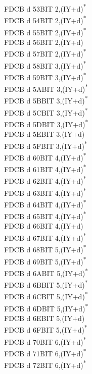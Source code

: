 \documentclass[twoside,openright,a4paper]{book}
\begin{document}
\begin{multicols}{3}
{\begin{tabbing}
	FDCB d 53\>BIT 2,(IY+d)\textsuperscript{*}\\
	FDCB d 54\>BIT 2,(IY+d)\textsuperscript{*}\\
	FDCB d 55\>BIT 2,(IY+d)\textsuperscript{*}\\
	FDCB d 56\>BIT 2,(IY+d)\\
	FDCB d 57\>BIT 2,(IY+d)\textsuperscript{*}\\
	FDCB d 58\>BIT 3,(IY+d)\textsuperscript{*}\\
	FDCB d 59\>BIT 3,(IY+d)\textsuperscript{*}\\
	FDCB d 5A\>BIT 3,(IY+d)\textsuperscript{*}\\
	FDCB d 5B\>BIT 3,(IY+d)\textsuperscript{*}\\
	FDCB d 5C\>BIT 3,(IY+d)\textsuperscript{*}\\
	FDCB d 5D\>BIT 3,(IY+d)\textsuperscript{*}\\
	FDCB d 5E\>BIT 3,(IY+d)\\
	FDCB d 5F\>BIT 3,(IY+d)\textsuperscript{*}\\
	FDCB d 60\>BIT 4,(IY+d)\textsuperscript{*}\\
	FDCB d 61\>BIT 4,(IY+d)\textsuperscript{*}\\
	FDCB d 62\>BIT 4,(IY+d)\textsuperscript{*}\\
	FDCB d 63\>BIT 4,(IY+d)\textsuperscript{*}\\
	FDCB d 64\>BIT 4,(IY+d)\textsuperscript{*}\\
	FDCB d 65\>BIT 4,(IY+d)\textsuperscript{*}\\
	FDCB d 66\>BIT 4,(IY+d)\\
	FDCB d 67\>BIT 4,(IY+d)\textsuperscript{*}\\
	FDCB d 68\>BIT 5,(IY+d)\textsuperscript{*}\\
	FDCB d 69\>BIT 5,(IY+d)\textsuperscript{*}\\
	FDCB d 6A\>BIT 5,(IY+d)\textsuperscript{*}\\
	FDCB d 6B\>BIT 5,(IY+d)\textsuperscript{*}\\
	FDCB d 6C\>BIT 5,(IY+d)\textsuperscript{*}\\
	FDCB d 6D\>BIT 5,(IY+d)\textsuperscript{*}\\
	FDCB d 6E\>BIT 5,(IY+d)\\
	FDCB d 6F\>BIT 5,(IY+d)\textsuperscript{*}\\
	FDCB d 70\>BIT 6,(IY+d)\textsuperscript{*}\\
	FDCB d 71\>BIT 6,(IY+d)\textsuperscript{*}\\
	FDCB d 72\>BIT 6,(IY+d)\textsuperscript{*}\\

\end{tabbing}}
\end{multicols}
\end{document}
